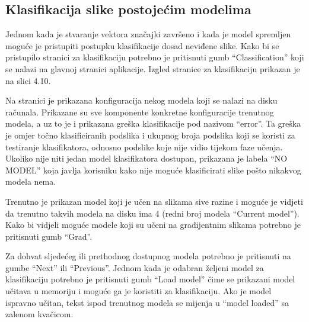 \documentclass[times, utf8, zavrsni]{fer}
\begin{document}
\subsection{Klasifikacija slike postojećim modelima}

Jednom kada je stvaranje vektora značajki završeno i kada je model spremljen 
moguće je pristupiti postupku klasifikacije dosad neviđene slike. Kako bi se pristupilo 
stranici za klasifikaciju potrebno je 
pritisnuti gumb \enquote{Classification} koji se nalazi na glavnoj 
stranici aplikacije. Izgled stranice za klasifikaciju prikazan je na 
slici 4.10.

\bigbreak 

Na stranici je prikazana konfiguracija nekog modela koji se nalazi na 
disku računala. Prikazane su sve komponente konkretne konfiguracije
trenutnog modela, a uz to je i prikazana greška klasifikacije pod
nazivom \enquote{error}. Ta greška je omjer točno klasificiranih
podslika i ukupnog broja podslika koji se koristi za testiranje klasifikatora,
odnosno podslike koje nije vidio tijekom faze učenja. Ukoliko nije niti 
jedan model klasifikatora dostupan, prikazana je labela \enquote{NO MODEL}
koja javlja korisniku kako nije moguće klasificirati slike pošto nikakvog modela
nema.

\bigbreak

Trenutno je prikazan model koji je učen na slikama sive razine i moguće
je vidjeti da trenutno takvih modela na disku ima 4 (redni broj modela
\enquote{Current model}). Kako bi vidjeli moguće modele koji su učeni na
gradijentnim slikama potrebno je pritisnuti gumb \enquote{Grad}.

\newpage

Za dohvat sljedećeg ili prethodnog dostupnog modela potrebno je pritisnuti na 
gumbe \enquote{Next} ili \enquote{Previous}. Jednom kada je odabran željeni
model za klasifikaciju potrebno je pritisnuti gumb \enquote{Load model} čime
se prikazani model učitava u memoriju i moguće ga je koristiti za klasifikaciju.
Ako je model ispravno učitan, tekst ispod trenutnog modela se mijenja
u \enquote{model loaded} sa zalenom kvačicom.

\bigbreak 
\end{document}
